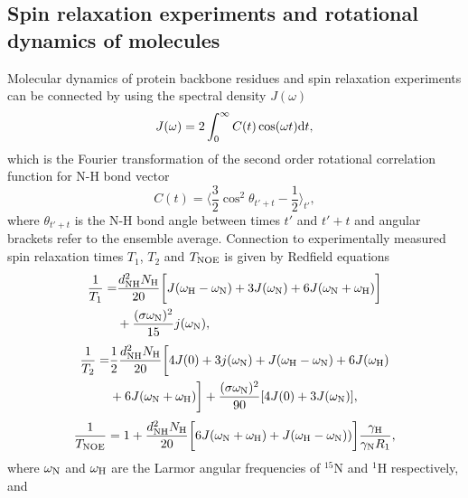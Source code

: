 \documentclass[pre,aps,floatfix,authordate1-4,twocolumn]{revtex4-1}
\begin{document}
\subsection{Spin relaxation experiments and rotational dynamics of molecules}
Molecular dynamics of protein backbone residues and spin relaxation experiments can
be connected by using the spectral density $J(\omega)$ 
\begin{equation}\label{SPECTdens}
  J(\omega)=2\int_0^\infty C(t) \cos(\omega t) {\rm d}t,
\end{equation}
which is the Fourier transformation of the second order
rotational correlation function for N-H bond vector
\begin{equation}\label{CORRFdef}
  C(t)=\langle \frac{3}{2}\cos^2\theta_{t'+t}-\frac{1}{2} \rangle_{t'},
\end{equation}
where $\theta_{t'+t}$ is the N-H bond angle between times $t'$ and $t'+t$
and angular brackets refer to the ensemble average.
Connection to experimentally measured spin relaxation times $T_1$, $T_2$
and $T_{\rm NOE}$ is given by Redfield equations \cite{abragam,kay89}
\begin{equation}\label{R1}
  \begin{aligned}
  \frac{1}{T_1}= & \frac{d_{\rm{NH}}^2N_{\rm{H}}}{20}\bigg[J(\omega_{\rm{H}}-\omega_{\rm{N}})+3J(\omega_{\rm{N}})+6J(\omega_{\rm{N}}+\omega_{\rm{H}})\bigg] \\
        & +\frac{(\sigma \omega_{\rm{N}})^2}{15}j(\omega_{\rm{N}}),
  \end{aligned}
\end{equation}
\begin{equation}\label{R2}
    \begin{aligned}
  \frac{1}{T_2}= & \frac{1}{2}\frac{d_{\rm{NH}}^2N_{\rm{H}}}{20}\bigg[4J(0)+3j(\omega_{\rm{N}})+J(\omega_{\rm{H}}-\omega_{\rm{N}})+6J(\omega_{\rm{H}})  \\
    & +6J(\omega_{\rm{N}}+\omega_{\rm{H}})\bigg]+\frac{(\sigma \omega_{\rm{N}})^2}{90}[4J(0) +3J(\omega_{\rm{N}})],
    \end{aligned}
\end{equation}
\begin{equation}\label{NOE}
  \frac{1}{T_{\rm NOE}}=1+\frac{d_{\rm{NH}}^2N_{\rm{H}}}{20}\bigg[6J(\omega_{\rm{N}}+\omega_{\rm{H}})+J(\omega_{\rm{H}}-\omega_{\rm{N}}))\bigg]\frac{\gamma_{\rm{H}}}{\gamma_{\rm{N}}R_1},
\end{equation}
where $\omega_{\rm{N}}$ and $\omega_{\rm{H}}$ are the Larmor angular
frequencies of $^{15}$N and $^1$H respectively, and
\end{document}
